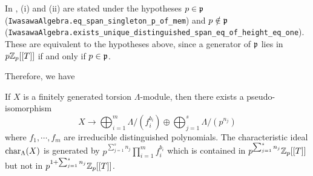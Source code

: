 \begin{remark}
In {\Lean}, (i) and (ii) are stated under the hypotheses $p\in{\mathfrak{p}}$
(\texttt{IwasawaAlgebra.eq\_span\_singleton\_p\_of\_mem}) and $p\notin{\mathfrak{p}}$
(\texttt{IwasawaAlgebra.exists\_unique\_distinguished\_span\_eq\_of\_height\_eq\_one}).
These are equivalent to the hypotheses above, since a generator of ${\mathfrak{p}}$ lies in
$p{\mathbb {Z}}_p[[T]]$ if and only if $p\in{\mathfrak{p}}$.
\end{remark}

Therefore, we have

\begin{prop}
\label{Lambda-module-structure}
If $X$ is a finitely generated torsion $\Lambda$-module,
then there exists a pseudo-isomorphism
$$
X\to\bigoplus_{i=1}^m\Lambda/(f_i^{b_i})\oplus\bigoplus_{j=1}^s\Lambda/(p^{n_j})
$$
where $f_1,\cdots,f_m$ are irreducible distinguished polynomials.
The characteristic ideal $\operatorname{char}_\Lambda(X)$ is generated by
$p^{\sum_{j=1}^sn_j}\prod_{i=1}^mf_i^{b_i}$
which is contained in $p^{\sum_{j=1}^sn_j}{\mathbb {Z}}_p[[T]]$
but not in $p^{1+\sum_{j=1}^sn_j}{\mathbb {Z}}_p[[T]]$.
\end{prop}

